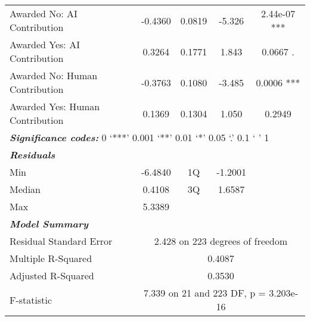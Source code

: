 \begin{table}[ht]
\begin{tabular}{lcccc}
        Awarded No: AI Contribution & -0.4360  & 0.0819  & -5.326  & 2.44e-07 ***  \\
        Awarded Yes: AI Contribution & 0.3264  & 0.1771  & 1.843  & 0.0667 .  \\
        Awarded No: Human Contribution & -0.3763  & 0.1080  & -3.485  & 0.0006 ***  \\
        Awarded Yes: Human Contribution & 0.1369  & 0.1304  & 1.050  & 0.2949  \\
        \midrule
        \multicolumn{5}{l}{\textbf{\textit{Significance codes:}} 0 ‘***’ 0.001 ‘**’ 0.01 ‘*’ 0.05 ‘.’ 0.1 ‘ ’ 1} \\
        \midrule
        \textbf{\textit{Residuals}} & \multicolumn{4}{c}{} \\
        Min & -6.4840 & 1Q & -1.2001 &  \\
        Median & 0.4108 & 3Q & 1.6587 &  \\
        Max & 5.3389 &  &  &  \\
        \midrule
        \textbf{\textit{Model Summary}}\\
        Residual Standard Error & \multicolumn{4}{c}{2.428 on 223 degrees of freedom} \\
        Multiple R-Squared & \multicolumn{4}{c}{0.4087} \\
        Adjusted R-Squared & \multicolumn{4}{c}{0.3530} \\
        F-statistic & \multicolumn{4}{c}{7.339 on 21 and 223 DF, p = 3.203e-16} \\
        \bottomrule
    \end{tabular}
    \label{tab:regression_fairness_male}
\end{table}



